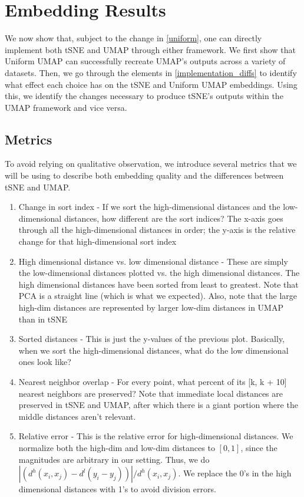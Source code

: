 \documentclass{article}
\theoremstyle{definition}
\begin{document}
\section{Embedding Results} \label{results}
We now show that, subject to the change in \ref{uniform}, one can directly implement both tSNE and UMAP through either framework. We first show that Uniform UMAP
can successfully recreate UMAP's outputs across a variety of datasets. Then, we go through the elements in \ref{implementation_diffs} to identify what effect
each choice has on the tSNE and Uniform UMAP embeddings. Using this, we identify the changes necessary to produce tSNE's outputs within the UMAP framework and vice versa.

\subsection{Metrics}
To avoid relying on qualitative observation, we introduce several metrics that we will be using to describe both embedding quality and the differences between
tSNE and UMAP.
\begin{enumerate}
    \item Change in sort index - If we sort the high-dimensional distances and the low-dimensional distances, how different are the sort indices? The x-axis
        goes through all the high-dimensional distances in order; the y-axis is the relative change for that high-dimensional sort index
    \item High dimensional distance vs. low dimensional distance - These are simply the low-dimensional distances plotted vs. the high dimensional distances. The high dimensional distances
        have been sorted from least to greatest. Note that PCA is a straight line (which is what we expected). Also, note that the large high-dim distances are
        represented by larger low-dim distances in UMAP than in tSNE
    \item Sorted distances - This is just the y-values of the previous plot. Basically, when we sort the high-dimensional distances, what do the low
        dimensional ones look like?
    \item Nearest neighbor overlap - For every point, what percent of its [k, k + 10] nearest neighbors are preserved? Note that immediate local distances are preserved in
        tSNE and UMAP, after which there is a giant portion where the middle distances aren't relevant.
    \item Relative error - This is the relative error for high-dimensional distances. We normalize both the high-dim and low-dim distances to $[0, 1]$, since the
        magnitudes are arbitrary in our setting. Thus, we do $| (d^h(x_i, x_j) - d^l(y_i - y_j)) |/ d^h(x_i, x_j)$. We replace the 0's in the high dimensional
        distances with 1's to avoid division errors.
\end{enumerate}
\end{document}
